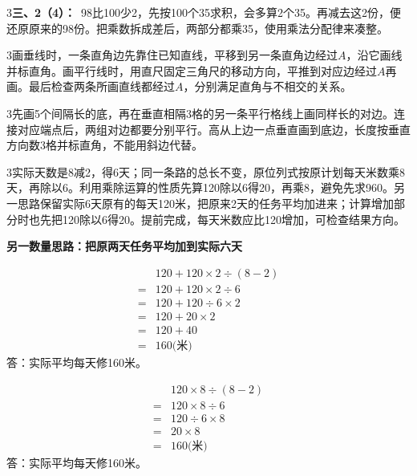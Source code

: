 \documentclass[multi=snippet,border={5bp 20bp 5bp 5bp}]{standalone}
\newenvironment{snippet}[3]{\begin{minipage}{#1bp}\color{answerred}\fontsize{#2}{#3}\selectfont\raggedright}{\end{minipage}}
\begin{document}
\begin{snippet}{505}{11.5}{14}\begin{multicols}{3}\raggedcolumns \textbf{三、2（4）：}\ 98比100少2，先按100个35求积，会多算2个35。再减去这2份，便还原原来的98份。把乘数拆成差后，两部分都乘35，使用乘法分配律来凑整。\end{multicols}\end{snippet}
\begin{snippet}{505}{11.5}{14}\begin{multicols}{3}\raggedcolumns 画垂线时，一条直角边先靠住已知直线，平移到另一条直角边经过\(A\)\allowbreak ，沿它画线并标直角。画平行线时，用直尺固定三角尺的移动方向，平推到对应边经过\(A\)\allowbreak 再画。最后检查两条所画直线都经过\(A\)\allowbreak ，分别满足直角与不相交的关系。\end{multicols}\end{snippet}
\begin{snippet}{505}{11.5}{14}\begin{multicols}{3}\raggedcolumns 先画5个间隔长的底，再在垂直相隔3格的另一条平行格线上画同样长的对边。连接对应端点后，两组对边都要分别平行。高从上边一点垂直画到底边，长度按垂直方向数3格并标直角，不能用斜边代替。\end{multicols}\end{snippet}
\begin{snippet}{505}{11.5}{14}\begin{multicols}{3}\raggedcolumns 实际天数是8减2，得6天；同一条路的总长不变，原位列式按原计划每天米数乘8天，再除以6。利用乘除运算的性质先算120除以6得20，再乘8，避免先求960。另一思路保留实际6天原有的每天120米，把原来2天的任务平均加进来；计算增加部分时也先把120除以6得20。提前完成，每天米数应比120增加，可检查结果方向。\par \textbf{另一数量思路：把原两天任务平均加到实际六天}\par \[\begin{aligned}&120+120\times2\div(8-2)\\={}&120+120\times2\div6\\={}&120+120\div6\times2\\={}&120+20\times2\\={}&120+40\\={}&160\text{(米)}\end{aligned}\]答：实际平均每天修160米。\end{multicols}\end{snippet}
\begin{snippet}{268}{10.5}{12.8}\SourceSans\setlength{\mathindent}{2bp}\[\begin{aligned}&120\times8\div(8-2)\\={}&120\times8\div6\\={}&120\div6\times8\\={}&20\times8\\={}&160\text{(米)}\end{aligned}\]答：实际平均每天修160米。\end{snippet}
\end{document}
